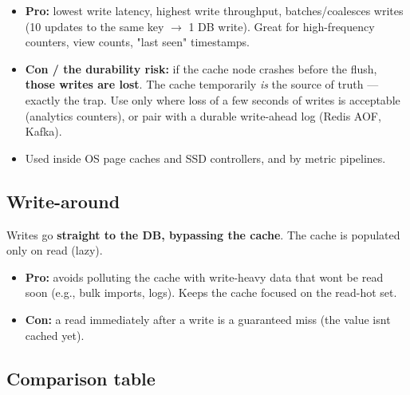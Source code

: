 \documentclass[11pt]{article}
\providecommand{\tightlist}{\setlength{\itemsep}{1pt}\setlength{\parskip}{0pt}}
\begin{document}
\begin{itemize}
\tightlist
\item
  \textbf{Pro:} lowest write latency, highest write throughput, batches/coalesces writes (10 updates to the same key \(\rightarrow\) 1 DB write). Great for high-frequency counters, view counts, "last seen" timestamps.
\item
  \textbf{Con / the durability risk:} if the cache node crashes before the flush, \textbf{those writes are lost}. The cache temporarily \emph{is} the source of truth --- exactly the trap. Use only where loss of a few seconds of writes is acceptable (analytics counters), or pair with a durable write-ahead log (Redis AOF, Kafka).
\item
  Used inside OS page caches and SSD controllers, and by metric pipelines.
\end{itemize}

\subsection{Write-around}\label{write-around}

Writes go \textbf{straight to the DB, bypassing the cache}. The cache is populated only on read (lazy).

\begin{itemize}
\tightlist
\item
  \textbf{Pro:} avoids polluting the cache with write-heavy data that won\textquotesingle t be read soon (e.g., bulk imports, logs). Keeps the cache focused on the read-hot set.
\item
  \textbf{Con:} a read immediately after a write is a guaranteed miss (the value isn\textquotesingle t cached yet).
\end{itemize}

\subsection{Comparison table}\label{comparison-table}
\end{document}
